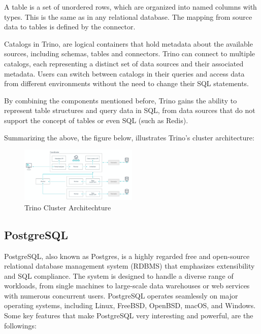 \documentclass[conference]{IEEEtran}
\begin{document}
A table is a set of unordered rows, which are organized into named columns with types. This is the same as in any relational database. The mapping from source data to tables is defined by the connector.

Catalogs in Trino, are logical containers that hold metadata about the available sources, including schemas, tables and connectors.
Trino can connect to multiple catalogs, each representing a distinct set of data sources and their associated metadata. 
Users can switch between catalogs in their queries and access data from different environments without the need to change their SQL statements.

By combining the components mentioned before, Trino gains the ability to represent table structures and query data in SQL, from data sources that do not support the concept of tables or even SQL (such as Redis).

Summarizing the above, the figure below, illustrates Trino's cluster architecture:
\begin{figure}[h]
    \includegraphics[width=0.5\textwidth]{images/trino-architecture.png}
    \caption{Trino Cluster Architechture}
    \label{fig:trino_architechture}
\end{figure}

\subsection{PostgreSQL}

PostgreSQL, also known as Postgres, is a highly regarded free and open-source relational database management system (RDBMS) that emphasizes
extensibility and SQL compliance. The system is designed to handle a diverse range of workloads, from single machines to large-scale data warehouses 
or web services with numerous concurrent users. PostgreSQL operates seamlessly on major operating systems, including Linux, FreeBSD, OpenBSD, macOS, and Windows.
Some key features that make PostgreSQL very interesting and powerful, are the followings:
\end{document}
